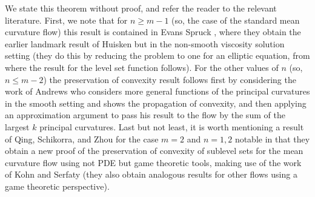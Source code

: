 \documentclass[reqno]{amsart}
\numberwithin{equation}{section}
\begin{document}
We state this theorem without proof, and refer the reader to the relevant literature. First, we note that for $n\geq m-1$ (so, the case of the standard mean curvature flow) this result is contained in Evans Spruck \cite[Section 7.4]{EvansSpruck1991}, where they obtain the earlier landmark result of Huisken \cite{Huisken1984} but in the non-smooth viscosity solution setting (they do this by reducing the problem to one for an elliptic equation, from where the result for the level set function follows). For the other values of $n$ (so, $n\leq m-2$) the preservation of convexity result follows first by considering the work of Andrews \cite{andrews1994contraction} who considers more general functions of the principal curvatures in the smooth setting and shows the propagation of convexity, and then applying an approximation argument to pass his result to the flow by the sum of the largest $k$ principal curvatures. Last but not least, it is worth mentioning a result of Qing, Schikorra, and Zhou \cite{QingSchikorraZhou2016} for the case $m=2$ and $n=1,2$ notable in that they obtain a new proof of the preservation of convexity of sublevel sets for the mean curvature flow using not PDE but game theoretic tools, making use of the work of Kohn and Serfaty \cite{KohnSerfaty2006} (they also obtain analogous results for other flows using a game theoretic perspective).
\end{document}
